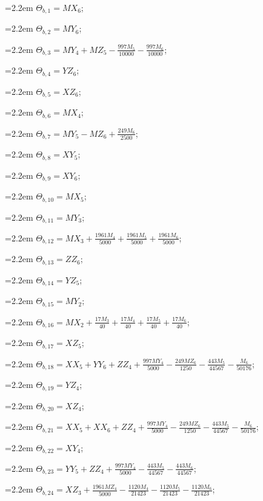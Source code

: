 {\small\setlength{\parindent}{0pt}\raggedright
\hangindent=2.2em $\Theta_{b,1}=MX_{6}$;\par
\hangindent=2.2em $\Theta_{b,2}=MY_{6}$;\par
\hangindent=2.2em $\Theta_{b,3}=MY_{4}+MZ_{5}-\tfrac{997M_{5}}{10000}-\tfrac{997M_{6}}{10000}$;\par
\hangindent=2.2em $\Theta_{b,4}=YZ_{6}$;\par
\hangindent=2.2em $\Theta_{b,5}=XZ_{6}$;\par
\hangindent=2.2em $\Theta_{b,6}=MX_{4}$;\par
\hangindent=2.2em $\Theta_{b,7}=MY_{5}-MZ_{6}+\tfrac{249M_{6}}{2500}$;\par
\hangindent=2.2em $\Theta_{b,8}=XY_{5}$;\par
\hangindent=2.2em $\Theta_{b,9}=XY_{6}$;\par
\hangindent=2.2em $\Theta_{b,10}=MX_{5}$;\par
\hangindent=2.2em $\Theta_{b,11}=MY_{3}$;\par
\hangindent=2.2em $\Theta_{b,12}=MX_{3}+\tfrac{1961M_{4}}{5000}+\tfrac{1961M_{5}}{5000}+\tfrac{1961M_{6}}{5000}$;\par
\hangindent=2.2em $\Theta_{b,13}=ZZ_{6}$;\par
\hangindent=2.2em $\Theta_{b,14}=YZ_{5}$;\par
\hangindent=2.2em $\Theta_{b,15}=MY_{2}$;\par
\hangindent=2.2em $\Theta_{b,16}=MX_{2}+\tfrac{17M_{3}}{40}+\tfrac{17M_{4}}{40}+\tfrac{17M_{5}}{40}+\tfrac{17M_{6}}{40}$;\par
\hangindent=2.2em $\Theta_{b,17}=XZ_{5}$;\par
\hangindent=2.2em $\Theta_{b,18}=XX_{5}+YY_{6}+ZZ_{4}+\tfrac{997MY_{4}}{5000}-\tfrac{249MZ_{6}}{1250}-\tfrac{443M_{5}}{44567}-\tfrac{M_{6}}{50176}$;\par
\hangindent=2.2em $\Theta_{b,19}=YZ_{4}$;\par
\hangindent=2.2em $\Theta_{b,20}=XZ_{4}$;\par
\hangindent=2.2em $\Theta_{b,21}=XX_{5}+XX_{6}+ZZ_{4}+\tfrac{997MY_{4}}{5000}-\tfrac{249MZ_{6}}{1250}-\tfrac{443M_{5}}{44567}-\tfrac{M_{6}}{50176}$;\par
\hangindent=2.2em $\Theta_{b,22}=XY_{4}$;\par
\hangindent=2.2em $\Theta_{b,23}=YY_{5}+ZZ_{4}+\tfrac{997MY_{4}}{5000}-\tfrac{443M_{5}}{44567}-\tfrac{443M_{6}}{44567}$;\par
\hangindent=2.2em $\Theta_{b,24}=XZ_{3}+\tfrac{1961MZ_{4}}{5000}-\tfrac{1120M_{4}}{21423}-\tfrac{1120M_{5}}{21423}-\tfrac{1120M_{6}}{21423}$;\par
}
